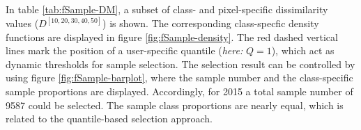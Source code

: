 In table \ref{tab:fSample-DM}, a subset of  class- and pixel-specific dissimilarity values ($D^{[10,20,30,40,50]}$) is shown. The corresponding class-specfic density functions are displayed in figure \ref{fig:fSample-density}. The red dashed vertical lines mark the position of a user-specific quantile (\textit{here:} $Q=1$), which act as dynamic thresholds for sample selection. The selection result can be controlled by using figure  \ref{fig:fSample-barplot}, where the sample number and the class-specific sample proportions are displayed. Accordingly, for 2015 a total sample number of 9587 could be selected. The sample class proportions are nearly equal, which is related to the quantile-based selection approach. 






\begin{figure}[p]
    \centering
{}


\end{figure}
